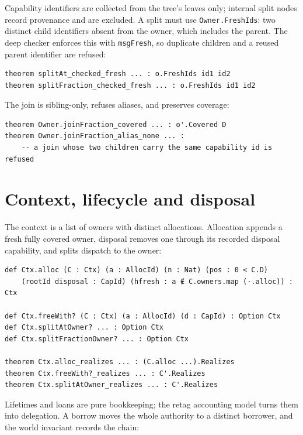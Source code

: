 \documentclass[10pt,a4paper]{article}
\newcommand{\file}[1]{\texttt{\small #1}}
\begin{document}
Capability identifiers are collected from the tree's leaves only; internal split
nodes record provenance and are excluded. A split must use \texttt{Owner.FreshIds}:
two distinct child identifiers absent from the owner, which includes the parent.
The deep checker enforces this with \texttt{msgFresh}, so duplicate children and a
reused parent identifier are refused:

\begin{lstlisting}[caption={\file{Cap/Core.lean}: freshness.}]
theorem splitAt_checked_fresh ... : o.FreshIds id1 id2
theorem splitFraction_checked_fresh ... : o.FreshIds id1 id2
\end{lstlisting}

The join is sibling-only, refuses aliases, and preserves coverage:

\begin{lstlisting}[caption={\file{Cap/Join.lean}.}]
theorem Owner.joinFraction_covered ... : o'.Covered D
theorem Owner.joinFraction_alias_none ... :
    -- a join whose two children carry the same capability id is refused
\end{lstlisting}

\section{Context, lifecycle and disposal}

The context is a list of owners with distinct allocations. Allocation appends a
fresh fully covered owner, disposal removes one through its recorded disposal
capability, and splits dispatch to the owner:

\begin{lstlisting}[caption={\file{Cap/Context.lean}.}]
def Ctx.alloc (C : Ctx) (a : AllocId) (n : Nat) (pos : 0 < C.D)
    (rootId disposal : CapId) (hfresh : a ∉ C.owners.map (·.alloc)) : Ctx

def Ctx.freeWith? (C : Ctx) (a : AllocId) (d : CapId) : Option Ctx
def Ctx.splitAtOwner? ... : Option Ctx
def Ctx.splitFractionOwner? ... : Option Ctx

theorem Ctx.alloc_realizes ... : (C.alloc ...).Realizes
theorem Ctx.freeWith?_realizes ... : C'.Realizes
theorem Ctx.splitAtOwner_realizes ... : C'.Realizes
\end{lstlisting}

Lifetimes and loans are pure bookkeeping; the retag accounting model turns them
into delegation. A borrow moves the whole authority to a distinct borrower, and
the world invariant records the chain:
\end{document}
